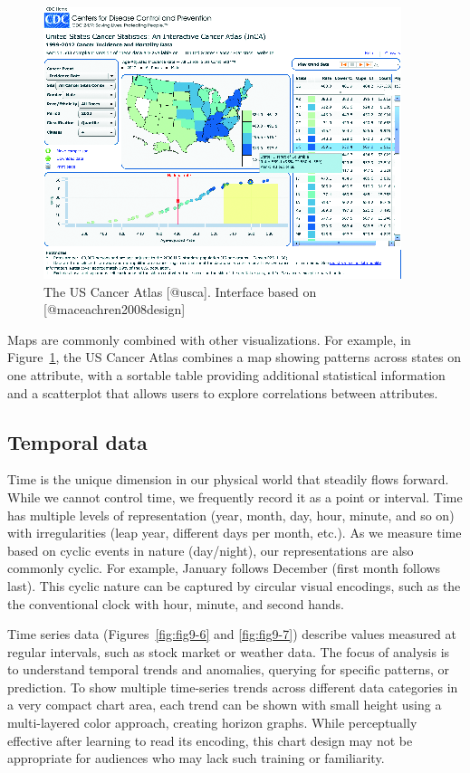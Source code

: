 \documentclass[]{krantz}
\begin{document}
\begin{figure}

{\centering \includegraphics[width=0.7\linewidth]{ChapterViz/figures/fig9-5} 

}

\caption{The US Cancer Atlas [@usca]. Interface based on [@maceachren2008design]}\label{fig:fig9-5}
\end{figure}

Maps are commonly combined with other visualizations. For example, in
Figure~\ref{fig:fig9-5}, the US Cancer Atlas combines a map showing
patterns across states on one attribute, with a sortable table providing
additional statistical information and a scatterplot that allows users
to explore correlations between attributes.

\subsection{Temporal data}\label{sec:viz-2.4}

Time is the unique dimension in our physical world that steadily flows
forward. While we cannot control time, we frequently record it as a
point or interval. Time has multiple levels of representation (year,
month, day, hour, minute, and so on) with irregularities (leap year,
different days per month, etc.). As we measure time based on cyclic
events in nature (day/night), our representations are also commonly
cyclic. For example, January follows December (first month follows
last). This cyclic nature can be captured by circular visual encodings,
such as the the conventional clock with hour, minute, and second hands.

Time series data (Figures~\ref{fig:fig9-6} and \ref{fig:fig9-7})
describe values measured at regular intervals, such as stock market or
weather data. The focus of analysis is to understand temporal trends and
anomalies, querying for specific patterns, or prediction. To show
multiple time-series trends across different data categories in a very
compact chart area, each trend can be shown with small height using a
multi-layered color approach, creating horizon graphs. While
perceptually effective after learning to read its encoding, this chart
design may not be appropriate for audiences who may lack such training
or familiarity.
\end{document}
